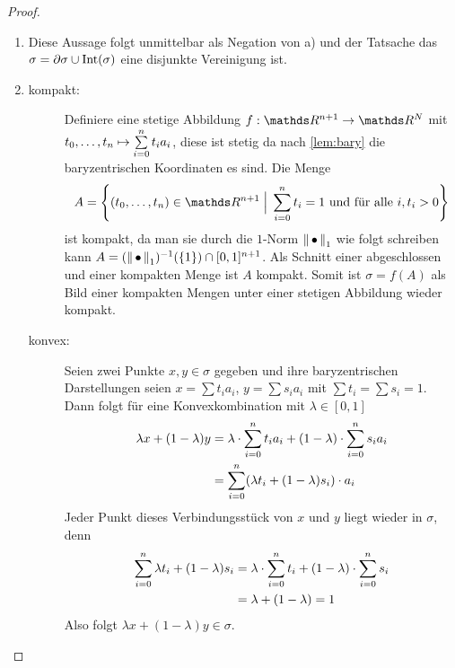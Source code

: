 \begin{Satz}
\begin{proof}
\begin{enumerate}[$a)$:]
    \item Diese Aussage folgt unmittelbar als Negation von a) und der
      Tatsache das $\sigma = \partial\sigma \cup \Int(\sigma)$ eine
      disjunkte Vereinigung ist.

    \item 
      \begin{description}
      \item[kompakt:] Definiere eine stetige Abbildung
        $f : \R^{n+1} \rightarrow \R^N$ mit
        $ t_0,\ldots ,t_n \mapsto \sp{0}{n} t_i a_i$, diese ist stetig da
        nach \cref{lem:bary} die baryzentrischen Koordinaten es
        sind. Die Menge
        \begin{gather*}
          A= \set{ (t_0,\ldots,t_n) \in \R^{n+1}}{ \sp{0}{n} t_i = 1
            \text{ und für alle } i , t_i > 0}
        \end{gather*}
        ist kompakt, da man sie durch die $1$-Norm $\nn_1$ wie folgt
        schreiben kann $A = (\nn_1)^{-1}(\{ 1 \}) \cap
        [0,1]^{n+1}$.
        Als Schnitt einer abgeschlossen und einer kompakten Menge ist
        $A$ kompakt.  Somit ist $\sigma = f(A)$ als Bild einer
        kompakten Mengen unter einer stetigen Abbildung wieder
        kompakt.
      \item[konvex:] Seien zwei Punkte $x,y \in \sigma$ gegeben und
        ihre baryzentrischen Darstellungen seien $x = \sum t_i a_i$,
        $y = \sum s_i a_i$ mit $\sum t_i = \sum s_i = 1$. Dann folgt
        für eine Konvexkombination mit $\lambda \in [0,1]$
        \renewcommand*{\theequation}{$*$}
        \begin{align}
          \nonumber
          \lambda x + (1- \lambda)y &= \lambda \cdot \sp{0}{n} t_i a_i%
                                      + (1-\lambda) \cdot \sp{0}{n} s_i a_i \\
                                    &= \sp{0}{n} (\lambda t_i +%
                                      (1-\lambda) s_i) \cdot a_i  
        \end{align}
        Jeder Punkt dieses Verbindungsstück von $x$ und $y$ liegt
        wieder in $\sigma$, denn
        \begin{align*}
          \sp{0}{n} \lambda t_i + (1-\lambda) s_i 
          &= \lambda \cdot \sp{0}{n} t_i + (1-\lambda) \cdot \sp{0}{n} s_i \\
          &= \lambda + (1 - \lambda) = 1
        \end{align*}
        Also folgt $\lambda x + (1- \lambda)y \in \sigma$.  


\end{description}
\end{enumerate}
\end{proof}
\end{Satz}

